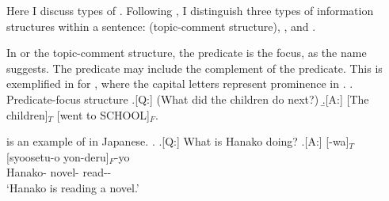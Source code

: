 Here I discuss types of .
Following ,
I distinguish three types of information structures within a sentence:
 (topic-comment structure),
, and
.

In  or the topic-comment structure,
the predicate is the focus, as the name suggests.
The predicate may include the complement of the predicate.
This is exemplified in \Next[A] for ,
where the capital letters represent prominence in .
\ex. Predicate-focus structure
	\a.[Q:] (What did the children do next?)
	\b.[A:] [The children]$_{T}$ [went to SCHOOL]$_{F}$.
	\hfill{\cite[][p.\ 121]{lambrecht94}}

\Next[A] is an example of  in Japanese.
%
\ex.
 \a.[Q:] What is Hanako doing?
 \bg.[A:] [-wa]$_{T}$ [syoosetu-o yon-deru]$_{F}$-yo \\
		Hanako- novel- read-- \\
		`Hanako is reading a novel.'

